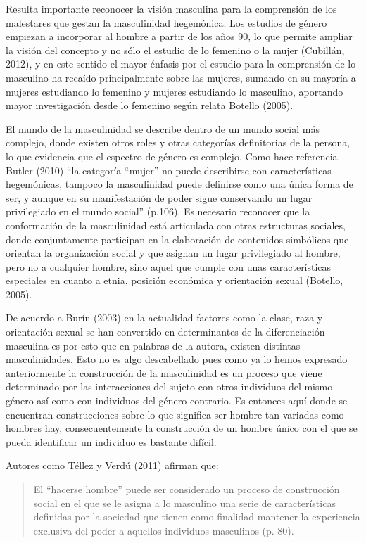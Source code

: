 Resulta importante reconocer la visión masculina para la comprensión de los
malestares que gestan la masculinidad hegemónica.
Los estudios de género empiezan a incorporar al hombre a partir de los años 90,
lo que permite ampliar la visión del concepto y no sólo el estudio de lo
femenino o la mujer (Cubillán, 2012), y en este sentido el mayor énfasis por el
estudio para la comprensión de lo masculino ha recaído principalmente sobre las
mujeres, sumando en su mayoría a mujeres estudiando lo femenino y mujeres
estudiando lo masculino, aportando mayor investigación desde lo femenino según
relata Botello (2005).

El mundo de la masculinidad se describe dentro de un mundo social más complejo,
donde existen otros roles y otras categorías definitorias de la persona, lo que
evidencia que el espectro de género es complejo.
Como hace referencia Butler (2010) “la categoría “mujer” no puede describirse
con características hegemónicas, tampoco la masculinidad puede definirse como
una única forma de ser, y aunque en su manifestación de poder sigue conservando
un lugar privilegiado en el mundo social” (p.106).
Es necesario reconocer que la conformación de la masculinidad está articulada
con otras estructuras sociales, donde conjuntamente participan en la elaboración
de contenidos simbólicos que orientan la organización social y que asignan un
lugar privilegiado al hombre, pero no a cualquier hombre, sino aquel que cumple
con unas características especiales en cuanto a etnia, posición económica y
orientación sexual (Botello, 2005).

De acuerdo a Burín (2003) en la actualidad factores como la clase, raza y
orientación sexual se han convertido en determinantes de la diferenciación
masculina es por esto que en palabras de la autora, existen distintas
masculinidades.
Esto no es algo descabellado pues como ya lo hemos expresado anteriormente la
construcción de la masculinidad es un proceso que viene determinado por las
interacciones del sujeto con otros individuos del mismo género así como con
individuos del género contrario.
Es entonces aquí donde se encuentran construcciones sobre lo que significa ser
hombre tan variadas como hombres hay, consecuentemente la construcción de un
hombre único con el que se pueda identificar un individuo es bastante difícil.

Autores como Téllez y Verdú (2011) afirman que:

\begin{quote}
    El “hacerse hombre” puede ser considerado un proceso de construcción social en
    el que se le asigna a lo masculino una serie de características definidas por la
    sociedad que tienen como finalidad mantener la experiencia exclusiva del poder a
    aquellos individuos masculinos (p. 80).
\end{quote}

